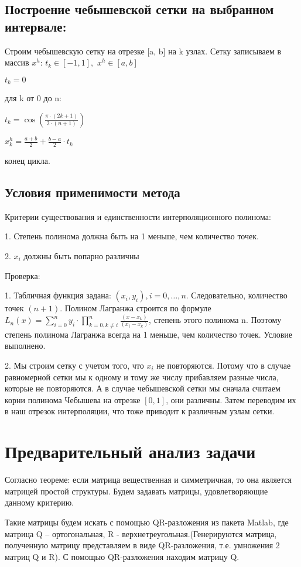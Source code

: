 \documentclass{article}
\begin{document}
	
	\subsection{Построение чебышевской сетки на выбранном интервале:}
	
	Строим чебышевскую сетку на отрезке [a, b] на k узлах. Сетку записываем в массив $x^h$:
	$t_k \in [-1, 1], $
	$x^h \in [a, b]$
	
	$t_k = 0 $
	
	для k от 0 до n:
	
	\quad $t_k = \cos(\frac{\pi \cdot (2k+1)}{2 \cdot (n+1)})$
	
	\quad $x^h_k = \frac{a+b}{2} + \frac{b-a}{2} \cdot t_k$
	
	конец цикла.
	
	\subsection{Условия применимости метода}
	Критерии существования и единственности интерполяционного полинома: 
	
	1. Степень полинома должна быть на 1 меньше, чем количество точек.
	
	2. $x_i$ должны быть попарно различны
	
	Проверка: 
	
	1.  Табличная функция задана: $(x_i,y_i ),i=0,…,n$. Следовательно, количество точек $(n+1)$. Полином Лагранжа строится по формуле $L_n (x)=\sum_{i=0}^{n}y_i\cdot\prod\limits_{k = 0, k \neq i}^n \frac{(x - x_k)}{(x_i-x_k)}$, степень этого полинома n. Поэтому степень полинома Лагранжа всегда на 1 меньше, чем количество точек. Условие выполнено.
	
	2. Мы строим сетку с учетом того, что $x_i$ не повторяются. Потому что в случае равномерной сетки мы к одному и тому же числу прибавляем разные числа, которые не повторяются. А в случае чебышевской сетки мы сначала считаем корни полинома Чебышева на отрезке $[0, 1]$, они различны. Затем переводим их в наш отрезок интерполяции, что тоже приводит к различным узлам сетки. 
	
	\section{Предварительный анализ задачи}
	Согласно теореме: если матрица вещественная и симметричная, то она является матрицей простой структуры. Будем задавать матрицы, удовлетворяющие данному критерию.
	
	Такие матрицы будем искать с помощью QR-разложения из пакета Matlab, где матрица Q – ортогональная, R - верхнетреугольная.(Генерируются матрица, полученную матрицу представляем в виде QR-разложения, т.е. умножения 2 матриц Q и R). С помощью QR-разложения находим матрицу Q.
	
\end{document}
